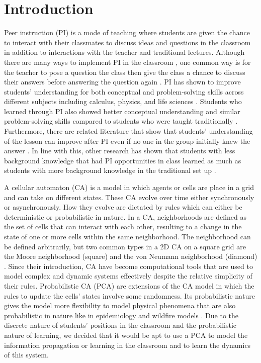 \documentclass[10pt,a4paper,twoside]{article}
\begin{document}
\section{Introduction}\label{sec:intro}
Peer instruction (PI) is a mode of teaching where students are given the chance to interact with their classmates to discuss ideas and questions in the classroom in addition to interactions with the teacher and traditional lectures. Although there are many ways to implement PI in the classroom \cite{knight2018peer}, one common way is for the teacher to pose a question the class then give the class a chance to discuss their answers before answering the question again \cite{crouch2001peer}. PI has shown to improve students' understanding for both conceptual and problem-solving skills across different subjects including calculus, physics, and life sciences \cite{crouch2001peer,smith2009peer}. Students who learned through PI also showed better conceptual understanding and similar problem-solving skills compared to students who were taught traditionally \cite{lasry2008peer}. Furthermore, there are related literature that show that students' understanding of the lesson can improve after PI even if no one in the group initially knew the answer \cite{smith2009peer}. In line with this, other research has shown that students with less background knowledge that had PI opportunities in class learned as much as students with more background knowledge in the traditional set up \cite{lasry2008peer}.

A cellular automaton (CA) is a model in which agents or cells are place in a grid and can take on different states. These CA evolve over time either synchronously or asynchronously. How they evolve are dictated by rules which can either be deterministic or probabilistic in nature. In a CA, neighborhoods are defined as the set of cells that can interact with each other, resulting to a change in the state of one or more cells within the same neighborhood. The neighborhood can be defined arbitrarily, but two common types in a 2D CA on a square grid are the Moore neighborhood (square) and the von Neumann neighborhood (diamond) \cite{weisstein2002cellular}. Since their introduction, CA have become computational tools that are used to model complex and dynamic systems effectively despite the relative simplicity of their rules. Probabilistic CA (PCA) are extensions of the CA model in which the rules to update the cells' states involve some randomness. Its probabilistic nature gives the model more flexibility to model physical phenomena that are also probabilistic in nature like in epidemiology and wildfire models \cite{louis2018probabilistic}. Due to the discrete nature of students' positions in the classroom and the probabilistic nature of learning, we decided that it would be apt to use a PCA to model the information propagation or learning in the classroom and to learn the dynamics of this system.
\end{document}
